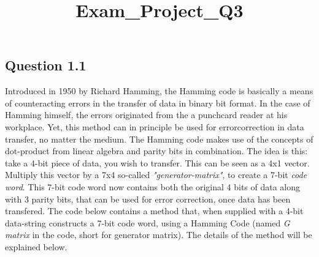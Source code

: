 \documentclass[11pt]{article}
\title{Exam\_Project\_Q3}
\begin{document}
    
    
    \maketitle
    
    

    
    \subsection{Question 1.1}\label{question-1.1}

Introduced in 1950 by Richard Hamming, the Hamming code is basically a
means of counteracting errors in the transfer of data in binary bit
format. In the case of Hamming himself, the errors originated from the a
punchcard reader at his workplace. Yet, this method can in principle be
used for errorcorrection in data transfer, no matter the medium. The
Hamming code makes use of the concepts of dot-product from linear
algebra and parity bits in combination. The idea is this: take a 4-bit
piece of data, you wish to transfer. This can be seen as a 4x1 vector.
Multiply this vector by a 7x4 so-called \emph{"generator-matrix"}, to
create a 7-bit \emph{code word}. This 7-bit code word now contains both
the original 4 bits of data along with 3 parity bits, that can be used
for error correction, once data has been transfered. The code below
contains a method that, when supplied with a 4-bit data-string
constructs a 7-bit code word, using a Hamming Code (named \emph{G
matrix} in the code, short for generator matrix). The details of the
method will be explained below.
\end{document}
